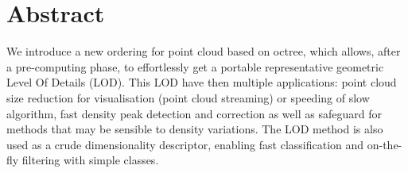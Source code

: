  
\section{Abstract}
	We introduce a new ordering for point cloud based on octree, which allows, after a pre-computing phase, to effortlessly get a portable representative geometric Level Of Details (LOD). This LOD have then multiple applications: point cloud size reduction for  visualisation (point cloud streaming) or speeding of slow algorithm, fast density peak detection and correction as well as safeguard for methods that may be sensible to density variations. The LOD method is also used as a crude dimensionality descriptor, enabling fast classification and on-the-fly filtering with simple classes. 
	 
	